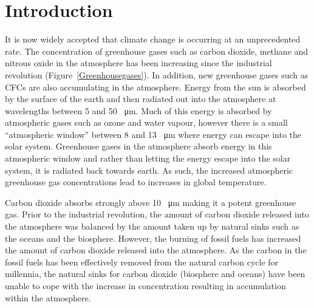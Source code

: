 
\chapter{Introduction}
\label{ch:introduction}

It is now widely accepted that climate change is occurring at an unprecedented rate.\cite{Oreskes2004}  The concentration of greenhouse gases such as carbon dioxide, methane and nitrous oxide in the atmosphere has been increasing since the industrial revolution (Figure~\ref{Greenhousegases})\cite{Jacobs1999}.  In addition, new greenhouse gases such as \glspl{CFC} are also accumulating in the atmosphere.  \cite{Jacobs1999}  Energy from the sun is absorbed by the surface of the earth and then radiated out into the atmosphere at wavelengths between 5 and 50 \SI{}{\micro\metre}.  Much of this energy is absorbed by atmospheric gases such as ozone and water vapour, however there is a small ``atmospheric window'' between 8 and 13 \SI{}{\micro\metre} where energy can escape into the solar system.  Greenhouse gases in the atmosphere absorb energy in this atmospheric window and rather than letting the energy escape into the solar system, it is radiated back towards earth.\cite{Hardy2003}  As such, the increased atmospheric greenhouse gas concentrations lead to increases in global temperature.\cite{Jacobs1999}

Carbon dioxide absorbs strongly above 10 \SI{}{\micro\metre} making it a potent greenhouse gas.\cite{Goody1951}  Prior to the industrial revolution, the amount of carbon dioxide released into the atmosphere was balanced by the amount taken up by natural sinks such as the oceans and the biosphere.  However, the burning of fossil fuels has increased the amount of carbon dioxide released into the atmosphere.  As the carbon in the fossil fuels has been effectively removed from the natural carbon cycle for millennia, the natural sinks for carbon dioxide (biosphere and oceans) have been unable to cope with the increase in concentration resulting in accumulation within the atmosphere.\cite{Jacobs1999}

